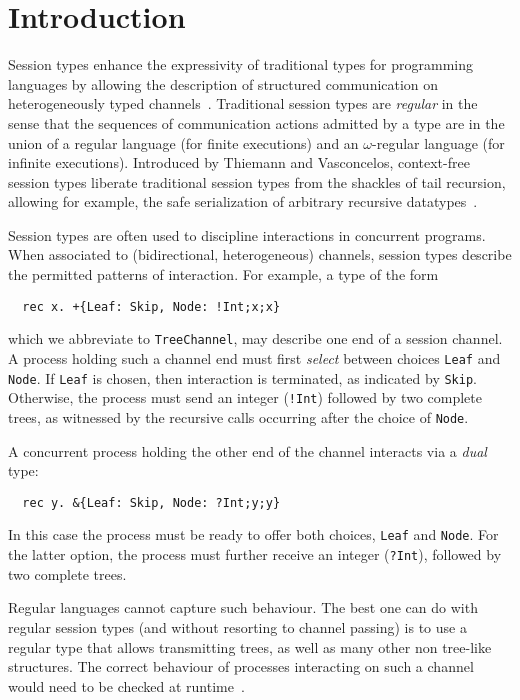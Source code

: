 \section{Introduction}
\label{sec:introduction}

Session types enhance the expressivity of traditional types for
programming languages by allowing the description of structured
communication on heterogeneously typed
channels~\cite{DBLP:conf/concur/Honda93,DBLP:conf/esop/HondaVK98,DBLP:conf/parle/TakeuchiHK94}.
%
Traditional session types are \emph{regular} in the sense that the
sequences of communication actions admitted by a type are in the union
of a regular language (for finite executions) and an $\omega$-regular
language (for infinite executions).
%
Introduced by Thiemann and Vasconcelos, context-free session types
liberate traditional session types from the shackles of tail
recursion, allowing for example, the safe serialization of arbitrary
recursive datatypes~\cite{thiemann2016context}.

Session types are often used to discipline interactions in concurrent
programs. When associated to (bidirectional, heterogeneous) channels,
session types describe the permitted patterns of interaction. For
example, a type of the form
%
\begin{lstlisting}
  rec x. +{Leaf: Skip, Node: !Int;x;x}
\end{lstlisting}
%
which we abbreviate to \lstinline|TreeChannel|, may describe one end
of a session channel. A process holding such a channel end must first
\emph{select} between choices \lstinline|Leaf| and
\lstinline|Node|. If \lstinline|Leaf| is chosen, then interaction is
terminated, as indicated by \lstinline|Skip|. Otherwise, the process
must send an integer (\lstinline|!Int|) followed by two complete trees,
as witnessed by the recursive calls occurring after the choice of 
\lstinline|Node|.

A concurrent process holding the other end of the channel 
interacts via a \emph{dual} type:
%
\begin{lstlisting}
  rec y. &{Leaf: Skip, Node: ?Int;y;y}
\end{lstlisting}
%
In this case the process must be ready to offer both choices,
\lstinline|Leaf| and \lstinline|Node|. For the latter option, the
process must further receive an integer (\lstinline|?Int|), followed
by two complete trees.

Regular languages cannot capture such behaviour. The best one can do
with regular session types (and without resorting to channel passing)
is to use a regular type that allows transmitting trees, as well as
many other non tree-like structures. The correct behaviour of
processes interacting on such a channel would need to be checked at
runtime~\cite{almeida.etal_freest-functional-language,thiemann2016context}.


